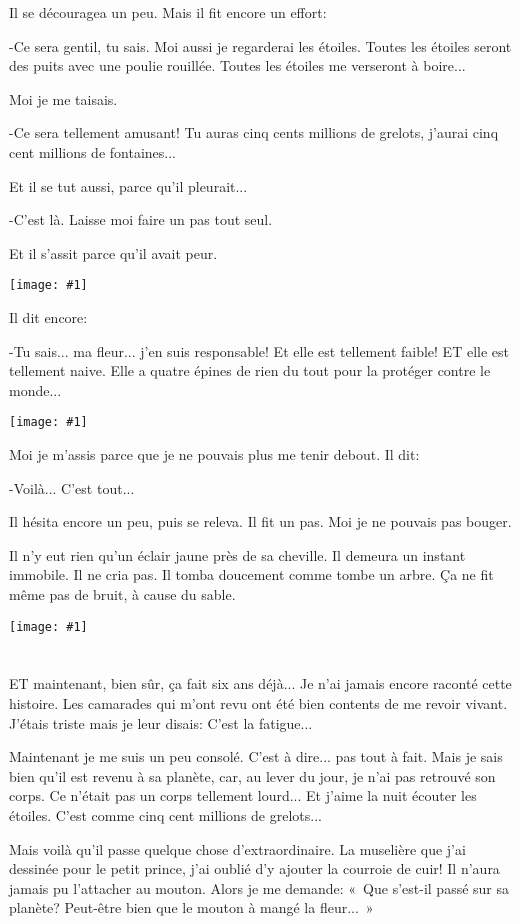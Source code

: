 \documentclass{report}
\newcommand{\parachapter}[2][]{\chapter[#1]{#2}}
\newcommand{\incpic}[1]{%
\begin{center}
    \texttt{[image: \#1]}
\end{center}%
}
\begin{document}
Il se découragea un peu. Mais il fit encore un effort:

-Ce sera gentil, tu sais. Moi aussi je regarderai les étoiles. Toutes les étoiles seront des puits avec une poulie rouillée. Toutes les étoiles me verseront à boire...

Moi je me taisais.

-Ce sera tellement amusant! Tu auras cinq cents millions de grelots, j'aurai cinq cent millions de fontaines...

Et il se tut aussi, parce qu'il pleurait...

-C'est là. Laisse moi faire un pas tout seul.

Et il s'assit parce qu'il avait peur. 

\incpic{pic/image43.jpeg}

Il dit encore:

-Tu sais... ma fleur... j'en suis responsable! Et elle est tellement faible! ET elle est tellement naive. Elle a quatre épines de rien du tout pour la protéger contre le monde... 

\incpic{pic/image44.jpeg}

Moi je m'assis parce que je ne pouvais plus me tenir debout. Il dit:

-Voilà... C'est tout...

Il hésita encore un peu, puis se releva. Il fit un pas. Moi je ne pouvais pas bouger.

Il n'y eut rien qu'un éclair jaune près de sa cheville. Il demeura un instant immobile. Il ne cria pas. Il tomba doucement comme tombe un arbre. Ça ne fit même pas de bruit, à cause du sable. 

\incpic{pic/image45.jpeg}

\parachapter{} %

ET maintenant, bien sûr, ça fait six ans déjà... Je n'ai jamais encore raconté cette histoire. Les camarades qui m'ont revu ont été bien contents de me revoir vivant. J'étais triste mais je leur disais: C'est la fatigue...

Maintenant je me suis un peu consolé. C'est à dire... pas tout à fait. Mais je sais bien qu'il est revenu à sa planète, car, au lever du jour, je n'ai pas retrouvé son corps. Ce n'était pas un corps tellement lourd... Et j'aime la nuit écouter les étoiles. C'est comme cinq cent millions de grelots...

Mais voilà qu'il passe quelque chose d'extraordinaire. La muselière que j'ai dessinée pour le petit prince, j'ai oublié d'y ajouter la courroie de cuir! Il n'aura jamais pu l'attacher au mouton. Alors je me demande: «~Que s'est-il passé sur sa planète? Peut-être bien que le mouton à mangé la fleur...~»
\end{document}
